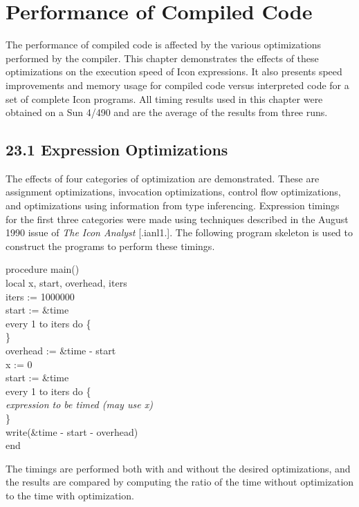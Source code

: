 \chapter{Performance of Compiled Code}

The performance of compiled code is affected by the various
optimizations performed by the compiler. This chapter demonstrates the
effects of these optimizations on the execution speed of Icon
expressions. It also presents speed improvements and memory usage for
compiled code versus interpreted code for a set of complete Icon
programs. All timing results used in this chapter were obtained on a
Sun 4/490 and are the average of the results from three runs.


\section[23.1 Expression Optimizations]{23.1 Expression Optimizations}

The effects of four categories of optimization are demonstrated. These
are assignment optimizations, invocation optimizations, control flow
optimizations, and optimizations using information from type
inferencing. Expression timings for the first three categories were
made using techniques described in the August 1990 issue of
\textit{The Icon Analyst} [.ianl1.]. The following program skeleton is
used to construct the programs to perform these timings.

\goodbreak
\begin{iconcode}
\>procedure main()\\
\>\>local x, start, overhead, iters\\
\>\>iters := 1000000\\
\>\>start := \&time\\
\>\>every 1 to iters do \{\\
\>\>\>\}\\
\>\>overhead := \&time - start\\
\>\>x := 0\\
\>\>start := \&time\\
\>\>every 1 to iters do \{\\
\>\>\>\textit{expression to be timed (may use x)}\\
\>\>\>\}\\
\>\>write(\&time - start - overhead)\\
\>end\\
\end{iconcode}

The timings are performed both with and without the desired
optimizations, and the results are compared by computing the ratio of
the time without optimization to the time with optimization.

